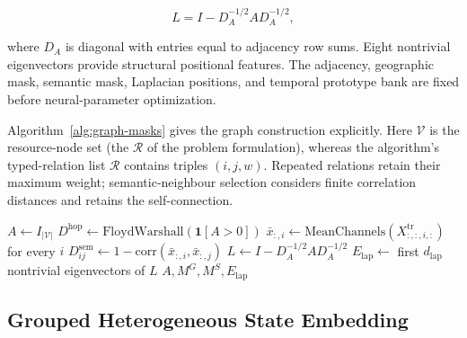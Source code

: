 \[
L=I-D_A^{-1/2}AD_A^{-1/2},
\]

where \(D_A\) is diagonal with entries equal to adjacency row sums. Eight nontrivial eigenvectors provide structural positional features. The adjacency, geographic mask, semantic mask, Laplacian positions, and temporal prototype bank are fixed before neural-parameter optimization.

Algorithm~\ref{alg:graph-masks} gives the graph construction explicitly. Here \(\mathcal{V}\) is the resource-node set (the \(\mathcal{R}\) of the problem formulation), whereas the algorithm's typed-relation list \(\mathcal{R}\) contains triples \((i,j,w)\). Repeated relations retain their maximum weight; semantic-neighbour selection considers finite correlation distances and retains the self-connection.

\begin{algorithm}[p]
\singlespacing
\footnotesize
\SetAlFnt{\footnotesize}
\SetAlCapFnt{\small}
\SetAlCapNameFnt{\small\bfseries}
\SetInd{0.5em}{0.8em}
\caption{Factory graph and attention-mask construction.}
\label{alg:graph-masks}
$A\leftarrow I_{|\mathcal{V}|}$\;
$D^{\mathrm{hop}}\leftarrow\mathrm{FloydWarshall}(\mathbf{1}[A>0])$\;
$\bar x_{:,i}\leftarrow\mathrm{MeanChannels}(X^{\mathrm{tr}}_{:,:,i,:})$ for every $i$\;
$D^{\mathrm{sem}}_{ij}\leftarrow1-\mathrm{corr}(\bar x_{:,i},\bar x_{:,j})$\;
$L\leftarrow I-D_A^{-1/2}AD_A^{-1/2}$\;
$E_{\mathrm{lap}}\leftarrow$ first $d_{\mathrm{lap}}$ nontrivial eigenvectors of $L$\;
\Return $A,M^G,M^S,E_{\mathrm{lap}}$\;
\end{algorithm}
\FloatBarrier

\subsection{Grouped Heterogeneous State Embedding}\label{grouped-heterogeneous-state-embedding}

